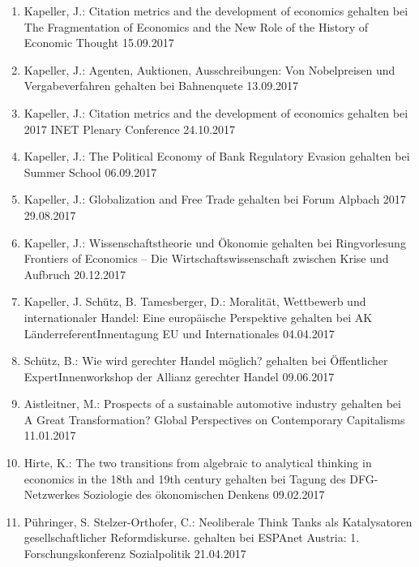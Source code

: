 \begin{enumerate}
	\item Kapeller, J.: Citation metrics and the development of economics gehalten bei The Fragmentation of Economics and the New Role of the History of Economic Thought 15.09.2017
	\item Kapeller, J.: Agenten, Auktionen, Ausschreibungen: Von Nobelpreisen und Vergabeverfahren gehalten bei Bahnenquete 13.09.2017
	\item Kapeller, J.: Citation metrics and the development of economics gehalten bei 2017 INET Plenary Conference 24.10.2017
	\item Kapeller, J.: The Political Economy of Bank Regulatory Evasion gehalten bei Summer School 06.09.2017
	\item Kapeller, J.: Globalization and Free Trade gehalten bei Forum Alpbach 2017 29.08.2017
	\item Kapeller, J.: Wissenschaftstheorie und Ökonomie gehalten bei Ringvorlesung \glqq Frontiers of Economics – Die Wirtschaftswissenschaft zwischen Krise und Aufbruch\grqq{} 20.12.2017
	\item Kapeller, J. Schütz, B. Tamesberger, D.: Moralität, Wettbewerb und internationaler Handel: Eine europäische Perspektive gehalten bei AK LänderreferentInnentagung EU und Internationales 04.04.2017
	\item Schütz, B.: Wie wird gerechter Handel möglich? gehalten bei Öffentlicher ExpertInnenworkshop der Allianz gerechter Handel 09.06.2017
	\item Aistleitner, M.: Prospects of a sustainable automotive industry gehalten bei A Great Transformation? Global Perspectives on Contemporary Capitalisms 11.01.2017
	\item Hirte, K.: The two transitions from algebraic to analytical thinking in economics in the 18th and 19th century gehalten bei Tagung des DFG-Netzwerkes \glqq Soziologie des ökonomischen Denkens\grqq{} 09.02.2017
	\item Pühringer, S. Stelzer-Orthofer, C.: Neoliberale Think Tanks als Katalysatoren gesellschaftlicher Reformdiskurse. gehalten bei ESPAnet Austria: 1. Forschungskonferenz Sozialpolitik 21.04.2017
\end{enumerate}
